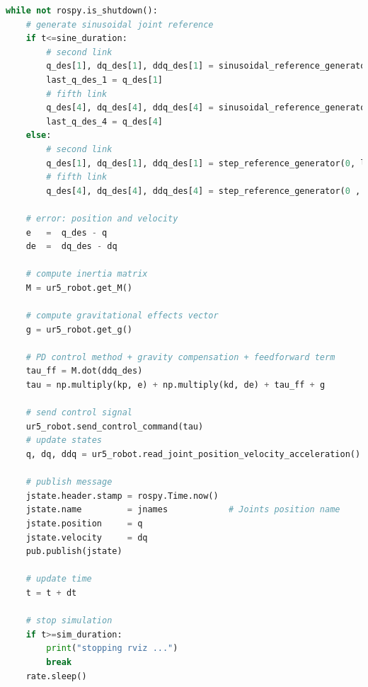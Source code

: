 \begin{lstlisting}[language=Python,caption={Move the second and fifth joint of UR5 robot with the requirement motion of activity 1.7.1}, label={lst:joint_PD_gravity_feedforward_sin}]
while not rospy.is_shutdown():
    # generate sinusoidal joint reference
    if t<=sine_duration:
        # second link
        q_des[1], dq_des[1], ddq_des[1] = sinusoidal_reference_generator(q0[1], dq0[1], ddq0[1], 0.2, 1, t)
        last_q_des_1 = q_des[1]
        # fifth link
        q_des[4], dq_des[4], ddq_des[4] = sinusoidal_reference_generator(q0[4], dq0[4], ddq0[4], 0.4, 1.5, t)  
        last_q_des_4 = q_des[4]  
    else:   
        # second link
        q_des[1], dq_des[1], ddq_des[1] = step_reference_generator(0, last_q_des_1)
        # fifth link
        q_des[4], dq_des[4], ddq_des[4] = step_reference_generator(0 , last_q_des_4)
    
    # error: position and velocity
    e 	=  q_des - q
    de 	=  dq_des - dq    

    # compute inertia matrix
    M = ur5_robot.get_M()

    # compute gravitational effects vector
    g = ur5_robot.get_g()

    # PD control method + gravity compensation + feedforward term
    tau_ff = M.dot(ddq_des)
    tau = np.multiply(kp, e) + np.multiply(kd, de) + tau_ff + g
    
    # send control signal
    ur5_robot.send_control_command(tau)
    # update states
    q, dq, ddq = ur5_robot.read_joint_position_velocity_acceleration()

    # publish message
    jstate.header.stamp = rospy.Time.now()
    jstate.name 		= jnames			# Joints position name
    jstate.position 	= q
    jstate.velocity 	= dq
    pub.publish(jstate)

    # update time
    t = t + dt

    # stop simulation
    if t>=sim_duration:
        print("stopping rviz ...")
        break
    rate.sleep()
\end{lstlisting}
 
